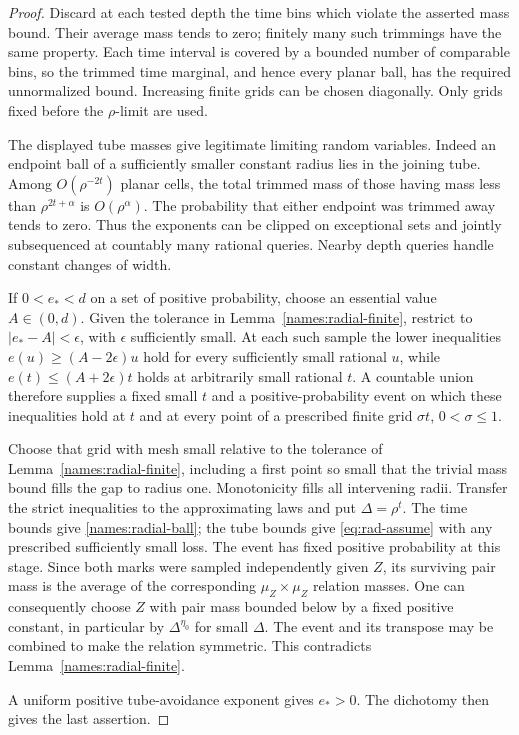 \begin{proof}
Discard at each tested depth the time bins which violate the
asserted mass bound.  Their average mass tends to zero; finitely
many such trimmings have the same property.  Each time interval
is covered by a bounded number of comparable bins, so the trimmed
time marginal, and hence every planar ball, has the required
unnormalized bound.  Increasing finite grids can be chosen
diagonally.  Only grids fixed before the $\rho$-limit are used.

The displayed tube masses give legitimate limiting random
variables.  Indeed an endpoint ball of a sufficiently smaller
constant radius lies in the joining tube.  Among $O(\rho^{-2t})$
planar cells, the total trimmed mass of those having mass less
than $\rho^{2t+\alpha}$ is $O(\rho^\alpha)$.  The probability
that either endpoint was trimmed away tends to zero.  Thus the
exponents can be clipped on exceptional sets and jointly
subsequenced at countably many rational queries.  Nearby depth
queries handle constant changes of width.

If $0<e_*<d$ on a set of positive probability, choose an
essential value $A\in(0,d)$.  Given the tolerance in
Lemma~\ref{names:radial-finite}, restrict to
$|e_*-A|<\epsilon$, with $\epsilon$ sufficiently small.
At each such sample the lower inequalities
$e(u)\geq(A-2\epsilon)u$ hold for every sufficiently small
rational $u$, while
$e(t)\leq(A+2\epsilon)t$ holds at arbitrarily small rational
$t$.  A countable union therefore supplies a fixed small $t$
and a positive-probability event on which these inequalities
hold at $t$ and at every point of a prescribed finite grid
$\sigma t$, $0<\sigma\leq1$.

Choose that grid with mesh small relative to the tolerance of
Lemma~\ref{names:radial-finite}, including a first point so
small that the trivial mass bound fills the gap to radius one.
Monotonicity fills all intervening radii.  Transfer the strict
inequalities to the approximating laws and put $\Delta=\rho^t$.
The time bounds give \eqref{names:radial-ball}; the tube bounds
give \eqref{eq:rad-assume} with any prescribed sufficiently
small loss.  The event has fixed positive probability at this
stage.  Since both marks were sampled independently given $Z$,
its surviving pair mass is the average of the corresponding
$\mu_Z\times\mu_Z$ relation masses.  One can consequently
choose $Z$ with pair mass bounded below by a fixed positive
constant, in particular by $\Delta^{\eta_0}$ for small
$\Delta$.  The event and its transpose may be combined to make
the relation symmetric.  This contradicts
Lemma~\ref{names:radial-finite}.

A uniform positive tube-avoidance exponent gives $e_*>0$.
The dichotomy then gives the last assertion.
\end{proof}

